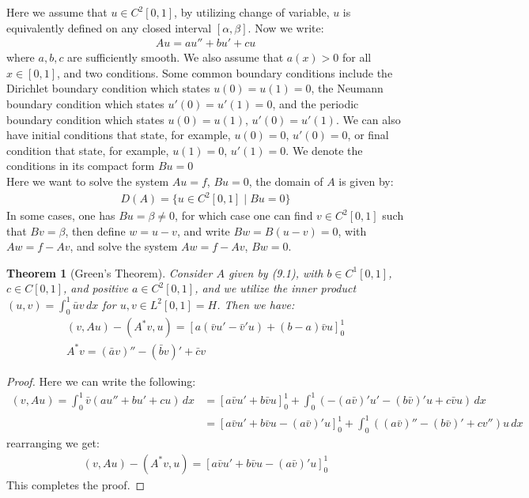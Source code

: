 \documentclass[11pt]{book}
\theoremstyle{break}
\theoremstyle{break}
\newtheorem{thm}{Theorem}[section]
\begin{document}
Here we assume that $u \in C^2[0,1]$, by utilizing change of variable, $u$ is equivalently defined on any closed interval $[\alpha,\beta]$. Now we write:
\begin{align}
Au = au'' + bu' +cu
\end{align}
where $a,b,c$ are sufficiently smooth. We also assume that $a(x) >0$ for all $x \in [0,1]$, and two conditions. Some common boundary conditions include the Dirichlet boundary condition which states $u(0) = u(1) = 0$, the Neumann boundary condition which states $u'(0) = u'(1) = 0$, and the periodic boundary condition which states $u(0) = u(1)$, $u'(0) = u'(1)$. We can also have initial conditions that state, for example, $u(0) = 0$, $u'(0) = 0$, or final condition that state, for example, $u(1) = 0$, $u'(1)= 0$. We denote the conditions in its compact form $Bu = 0$\\

Here we want to solve the system $Au = f$, $Bu = 0$, the domain of $A$ is given by:
\begin{align*}
D(A) = \{ u \in C^2[0,1] \mid Bu = 0\}
\end{align*}
In some cases, one has $Bu = \beta \neq 0$, for which case one can find $v \in C^2[0,1]$ such that $Bv = \beta$, then define $w = u-v$, and write $Bw = B(u-v) = 0$, with $Aw = f-Av$, and solve the system $Aw = f-Av$, $Bw = 0$. 

\begin{thm}[Green's Theorem]
Consider $A$ given by (9.1), with $b \in C^1[0,1]$, $c\in C[0,1]$, and positive $a \in C^2[0,1]$, and we utilize the inner product $(u,v) = \int_0^1 \bar{u}v\, dx$ for $u,v \in L^2[0,1] = H$. Then we have:
\begin{align}
(v,Au) - (A^*v, u) = \left[a(\bar{v}u' - \bar{v}'u)+(b-a)\bar{v}u \right]_0^1 \\
A^*v = (\bar{a}v)'' - (\bar{b}v)' + \bar{c}v
\end{align}
\end{thm}
\begin{proof}
Here we can write the following:
\begin{align*}
(v,Au) = \int_0^1 \bar{v}(au'' + bu' +cu) \, dx &= [a\bar{v}u'+b\bar{v}u]_0^1 + \int_0^1 \left(-(a\bar{v})'u' - (b\bar{v})'u + c\bar{v}u\right)\, dx\\
&=[a\bar{v}u'+ b\bar{v}u - (a\bar{v})' u]_0^1 + \int_0^1 \left((a\bar{v})'' - (b\bar{v})' +cv''\right)u\, dx
\end{align*}
rearranging we get:
\begin{align*}
(v,Au) - (A^* v, u) = [a\bar{v}u'+ b\bar{v}u - (a\bar{v})' u]_0^1 
\end{align*}
This completes the proof.
\end{proof}
\end{document}
